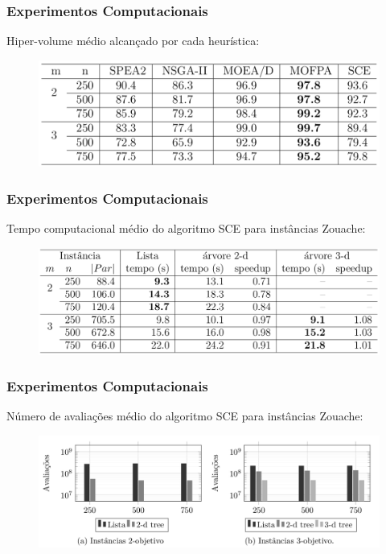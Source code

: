 \documentclass[10pt,xcolor=table,fleqn]{beamer}
\begin{document}
\begin{frame}
  \frametitle{Experimentos Computacionais}
  Hiper-volume médio alcançado por cada heurística:
  \begin{figure}
    \centering
    \includegraphics[width=1.0\textwidth]{../tab/sce/zitzler-hvol}
  \end{figure}
\end{frame}

\begin{frame}
  \frametitle{Experimentos Computacionais}
  Tempo computacional médio do algoritmo SCE para instâncias Zouache:
  \begin{figure}
    \centering
    \includegraphics[width=1.0\textwidth]{../tab/sce/cpures}
  \end{figure}
\end{frame}

\begin{frame}
  \frametitle{Experimentos Computacionais}
  Número de avaliações médio do algoritmo SCE para instâncias Zouache:
  \begin{figure}
    \centering
    \includegraphics[width=1.0\textwidth]{../tab/sce/cmpres}
  \end{figure}
\end{frame}
\end{document}
